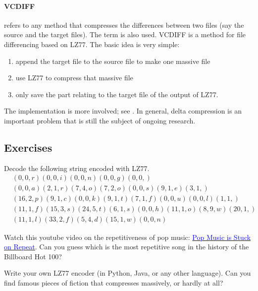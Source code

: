 \documentclass[a4paper, 11pt, openany]{book}
\begin{document}
\paragraph{VCDIFF}  refers to any method that compresses the differences between two files (say the source and the target files). The term  is also used. VCDIFF is a method for file differencing based on LZ77. The basic idea is very simple:
\begin{enumerate}
    \item append the target file to the source file to make one massive file

    \item use LZ77 to compress that massive file

    \item only save the part relating to the target file of the output of LZ77.
\end{enumerate}
The implementation is more involved; see \cite{KMMV02}. In general, delta compression is an important problem that is still the subject of ongoing research.


\subsection{Exercises}

\begin{exercise}
Decode the following string encoded with LZ77.
\begin{align*}
&(0,0,r)(0,0,i)(0,0,n)(0,0,g)(0,0, ) \\
& (0,0,a)(2,1,r)(7,4,o)(7,2,o)(0,0,s)(9,1,e)(3,1, )\\
& (16,2,p)(9,1,c)(0,0,k)(9,1,t)(7,1,f)(0,0,u)(0,0,l)(1,1, )\\
& (11,1,f)(15,3,s)(24,5,t)(6,1,s)(0,0,h)(11,1,o)(8,9,w)(20,1, )\\
& (11,1,l)(33,2,f)(5,4,d)(15,1,w)(0,0,n)
\end{align*}
\end{exercise}


\begin{exercise}
Watch this youtube video on the repetitiveness of pop music: \href{https://www.youtube.com/watch?v=_tjFwcmHy5M}{\textcolor{blue}{Pop Music is Stuck on Repeat}}. Can you guess which is the most repetitive song in the history of the Billboard Hot 100?
\end{exercise}

\begin{exercise}
Write your own LZ77 encoder (in Python, Java, or any other language). Can you find famous pieces of fiction that compresses massively, or hardly at all?
\end{exercise}
\end{document}
